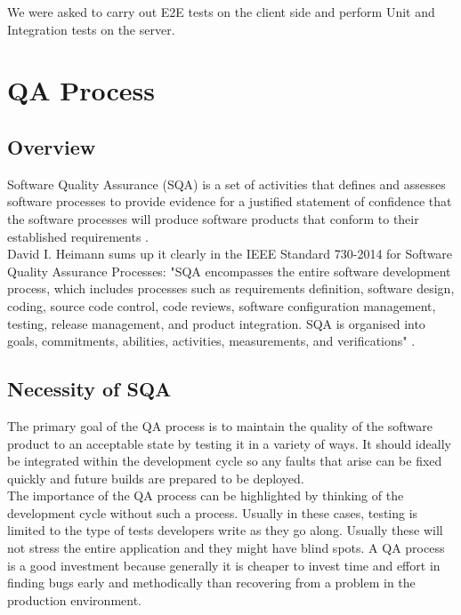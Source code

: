 We were asked to carry out E2E tests on the client side and perform Unit and Integration tests on the server.

\section{QA Process}
\label{sec:qa-process}

\subsection{Overview}
\label{subsec:qa-process-what-is-it}
Software Quality Assurance (SQA) is a set of activities that defines and assesses software processes to provide evidence for a justified statement of confidence that the software processes will produce software products that conform to their established requirements \cite{qa-standard}.
\\

David I. Heimann sums up it clearly in the IEEE Standard 730-2014 for Software Quality Assurance Processes: "SQA encompasses the entire software development process, which includes processes such as requirements definition, software design, coding, source code control, code reviews, software configuration management, testing, release management, and product integration. SQA is organised into goals, commitments, abilities, activities, measurements, and verifications" \cite{project-quality-management}.

\subsection{Necessity of SQA}
\label{subsec:qa-process-why-do-we-need-it}
The primary goal of the QA process is to maintain the quality of the software product to an acceptable state by testing it in a variety of ways. It should ideally be integrated within the development cycle so any faults that arise can be fixed quickly and future builds are prepared to be deployed.
\\

The importance of the QA process can be highlighted by thinking of the development cycle without such a process. Usually in these cases, testing is limited to the type of tests developers write as they go along. Usually these will not stress the entire application and they might have blind spots. A QA process is a good investment because generally it is cheaper to invest time and effort in finding bugs early and methodically than recovering from a problem in the production environment.

